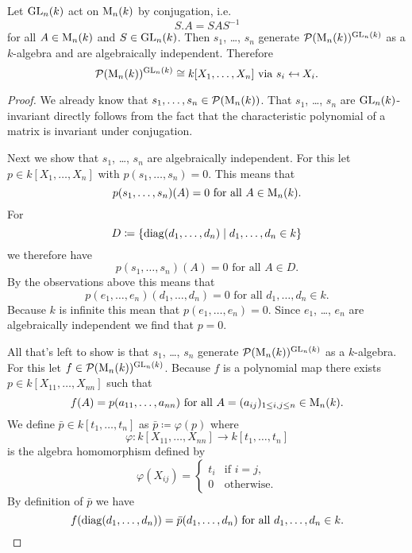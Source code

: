 \begin{thrm}
 Let $\operatorname{GL}_n(k)$ act on $\operatorname{M}_n(k)$ by conjugation, i.e.
 \[
  S.A = SAS^{-1}
 \]
 for all $A \in \operatorname{M}_n(k)$ and $S \in \operatorname{GL}_n(k)$. Then $s_1$, \dots, $s_n$ generate $\mathcal{P}(\operatorname{M}_n(k))^{\operatorname{GL}_n(k)}$ as a $k$-algebra and are algebraically independent. Therefore
 \[
  \mathcal{P}(\operatorname{M}_n(k))^{\operatorname{GL}_n(k)} \cong k[X_1, \dotsc, X_n] \text{ via } s_i \mapsfrom X_i.
 \]
\end{thrm}
\begin{proof}
 We already know that $s_1, \dotsc, s_n \in \mathcal{P}(\operatorname{M}_n(k))$. That $s_1$, \dots, $s_n$ are $\operatorname{GL}_n(k)$-invariant directly follows from the fact that the characteristic polynomial of a matrix is invariant under conjugation.
 
 Next we show that $s_1$, \dots, $s_n$ are algebraically independent. For this let $p \in k[X_1, \dotsc, X_n]$ with $p(s_1, \dotsc, s_n) = 0$. This means that
 \[
  p(s_1, \dotsc, s_n)(A) = 0 \text{ for all } A \in \operatorname{M}_n(k).
 \]
 For
 \[
  D \coloneqq \{\operatorname{diag}(d_1, \dotsc, d_n) \mid d_1, \dotsc, d_n \in k\}
 \]
 we therefore have
 \[
  p(s_1, \dotsc, s_n)(A) = 0 \text{ for all } A \in D.
 \]
 By the observations above this means that 
 \[
  p(e_1, \dotsc, e_n)(d_1, \dotsc, d_n) = 0 \text{ for all } d_1, \dotsc, d_n \in k.
 \]
 Because $k$ is infinite this mean that $p(e_1, \dotsc, e_n) = 0$. Since $e_1$, \dots, $e_n$ are algebraically independent we find that $p =0$.
 
 All that’s left to show is that $s_1$, \dots, $s_n$ generate $\mathcal{P}(\operatorname{M}_n(k))^{\operatorname{GL}_n(k)}$ as a $k$-algebra. For this let $f \in \mathcal{P}(\operatorname{M}_n(k))^{\operatorname{GL}_n(k)}$. Because $f$ is a polynomial map there exists $p \in k[X_{11}, \dotsc, X_{nn}]$ such that
 \[
  f(A) = p(a_{11}, \dotsc, a_{nn}) \text{ for all } A = (a_{ij})_{1 \leq i,j \leq n} \in \operatorname{M}_n(k).
 \]
 We define $\bar{p} \in k[t_1, \dotsc, t_n]$ as $\bar{p} \coloneqq \varphi(p)$ where
 \[
  \varphi \colon k[X_{11}, \dotsc, X_{nn}] \to k[t_1, \dotsc, t_n]
 \]
 is the algebra homomorphism defined by
 \[
  \varphi(X_{ij}) =
  \begin{cases}
   t_i & \text{if } i = j, \\
     0 & \text{otherwise}.
  \end{cases}
 \]
 By definition of $\bar{p}$ we have
 \[
  f(\operatorname{diag}(d_1, \dotsc, d_n)) = \bar{p}(d_1, \dotsc, d_n) \text{ for all } d_1, \dotsc, d_n \in k.
 \]
 

\end{proof}
